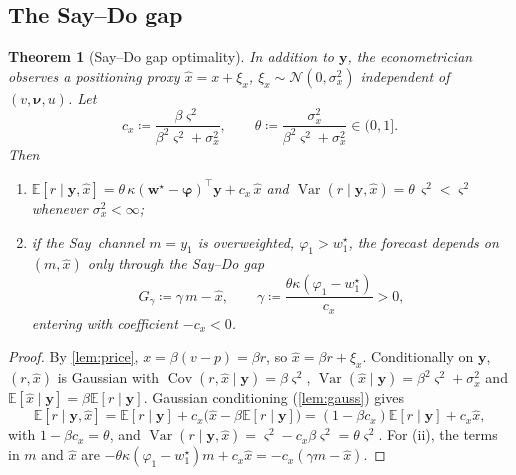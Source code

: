 \documentclass{article}
\theoremstyle{plain}
\newtheorem{theorem}{Theorem}
\theoremstyle{definition}
\theoremstyle{remark}
\newcommand{\E}{\mathbb{E}}
\newcommand{\N}{\mathcal{N}}
\newcommand{\w}{\bm{w}}
\newcommand{\y}{\bm{y}}
\newcommand{\bphi}{\bm{\varphi}}
\DeclareMathOperator{\Var}{Var}
\DeclareMathOperator{\Cov}{Cov}
\newcommand{\SAY}{\textcolor{say}{\textsf{Say}}}
\begin{document}
\subsection{The Say--Do gap}
\begin{theorem}[Say--Do gap optimality]\label{thm:saydo}
In addition to $\y$, the econometrician observes a positioning proxy $\hat x=x+\xi_x$, $\xi_x\sim\N(0,\sigma_x^2)$ independent of $(v,\bm\nu,u)$. Let
\[
  c_x\coloneqq\frac{\beta\varsigma^2}{\beta^2\varsigma^2+\sigma_x^2},\qquad \theta\coloneqq\frac{\sigma_x^2}{\beta^2\varsigma^2+\sigma_x^2}\in(0,1].
\]
Then
\begin{enumerate}[label=(\roman*)]
  \item $\E[r\mid\y,\hat x]=\theta\,\kappa(\w^\star-\bphi)^\top\y+c_x\,\hat x$ and $\Var(r\mid\y,\hat x)=\theta\,\varsigma^2<\varsigma^2$ whenever $\sigma_x^2<\infty$;
  \item if the \SAY\ channel $m=y_1$ is overweighted, $\varphi_1>w^\star_1$, the forecast depends on $(m,\hat x)$ only through the \emph{Say--Do gap}
  \[
    G_\gamma\coloneqq\gamma\, m-\hat x,\qquad \gamma\coloneqq\frac{\theta\kappa(\varphi_1-w^\star_1)}{c_x}>0,
  \]
  entering with coefficient $-c_x<0$.
\end{enumerate}
\end{theorem}
\begin{proof}
By \cref{lem:price}, $x=\beta(v-p)=\beta r$, so $\hat x=\beta r+\xi_x$. Conditionally on $\y$, $(r,\hat x)$ is Gaussian with $\Cov(r,\hat x\mid\y)=\beta\varsigma^2$, $\Var(\hat x\mid\y)=\beta^2\varsigma^2+\sigma_x^2$ and $\E[\hat x\mid\y]=\beta\E[r\mid\y]$. Gaussian conditioning (\cref{lem:gauss}) gives
\[
  \E[r\mid\y,\hat x]=\E[r\mid\y]+c_x\big(\hat x-\beta\E[r\mid\y]\big)=(1-\beta c_x)\E[r\mid\y]+c_x\hat x,
\]
with $1-\beta c_x=\theta$, and $\Var(r\mid\y,\hat x)=\varsigma^2-c_x\beta\varsigma^2=\theta\varsigma^2$. For (ii), the terms in $m$ and $\hat x$ are $-\theta\kappa(\varphi_1-w^\star_1)m+c_x\hat x=-c_x(\gamma m-\hat x)$.
\end{proof}
\end{document}
